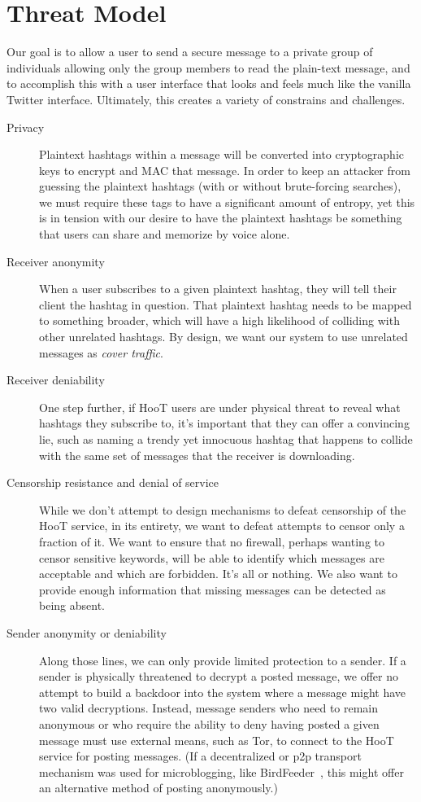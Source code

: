 \section{Threat Model}

Our goal is to allow a user to send a secure message to a private group of individuals allowing only the group members to read the plain-text message, and to accomplish this with a user interface that looks and feels much like the vanilla Twitter interface. Ultimately, this creates a variety of constrains and challenges.

\begin{description}
\item[Privacy] Plaintext hashtags within a message will be converted into cryptographic keys to encrypt and MAC that message.  In order to keep an attacker from guessing the plaintext hashtags (with or without brute-forcing searches), we must require these tags to have a significant amount of entropy, yet this is in tension with our desire to have the plaintext hashtags be something that users can share and memorize by voice alone.

\item[Receiver anonymity]  When a user subscribes to a given plaintext hashtag, they will tell their client the hashtag in question. That plaintext hashtag needs to be mapped to something broader, which will have a high likelihood of colliding with other unrelated hashtags. By design, we want our system to use unrelated messages as {\em cover traffic}.

\item[Receiver deniability] One step further, if HooT users are under physical threat to reveal what hashtags they subscribe to, it's important that they can offer a convincing lie, such as naming a trendy yet innocuous hashtag that happens to collide with the same set of messages that the receiver is downloading.

\item[Censorship resistance and denial of service] While we don't attempt to design mechanisms to defeat censorship of the HooT service, in its entirety, we want to defeat attempts to censor only a fraction of it. We want to ensure that no firewall, perhaps wanting to censor sensitive keywords, will be able to identify which messages are acceptable and which are forbidden. It's all or nothing. We also want to provide enough information that missing messages can be detected as being absent.

\item[Sender anonymity or deniability] Along those lines, we can only provide limited protection to a sender. If a sender is physically threatened to decrypt a posted message, we offer no attempt to build a backdoor into the system where a message might have two valid decryptions. Instead, message senders who need to remain anonymous or who require the ability to deny having posted a given message must use external means, such as Tor, to connect to the HooT service for posting messages. (If a decentralized or p2p transport mechanism was used for microblogging, like BirdFeeder~\cite{sandler08}, this might offer an alternative method of posting anonymously.)


\end{description}
